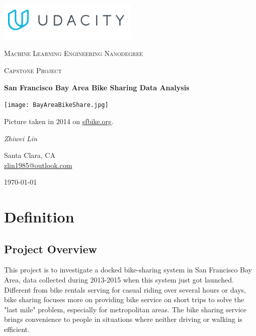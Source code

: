 \documentclass[a4paper]{article}
\begin{document}
	\begin{titlepage}
		\centering
		
		\includegraphics[width=0.5\textwidth]{udacity_logo.png}\par\vspace{1cm}
		
		{\scshape\LARGE Machine Learning Engineering Nanodegree \par}
		\vspace{1cm}
		
		{\scshape\Large Capstone Project\par}
		\vspace{1.5cm}
		
		{\huge\bfseries San Francisco Bay Area Bike Sharing Data Analysis\par}
		\vspace{1cm}
		
		\texttt{[image: BayAreaBikeShare.jpg]}\par
		{\small Picture taken in 2014 on \href{http://www.sfbike.org/wp-content/uploads/2014/02/BikeShare_746x488.jpg}{sfbike.org}. \par}\vspace{1cm}
		
		
		{\Large\itshape Zhiwei Lin\par}
		{Santa Clara, CA \\
		\href{zlin1985@outlook.com}{zlin1985@outlook.com}}
		\vfill
		
		{\large \today\par}		
	\end{titlepage}
	
	\pagebreak
	\tableofcontents
	\pagebreak
	
	\section{Definition}
		\subsection{Project Overview}
		
		This project is to investigate a docked bike-sharing system in San Francisco Bay Area, data collected during 2013-2015 when this system just got launched. Different from bike rentals serving for casual riding over several hours or days, bike sharing focuses more on providing bike service on short trips to solve the "last mile" problem, especially for metropolitan areas. The bike sharing service brings convenience to people in situations where neither driving or walking is efficient.
		
\end{document}
